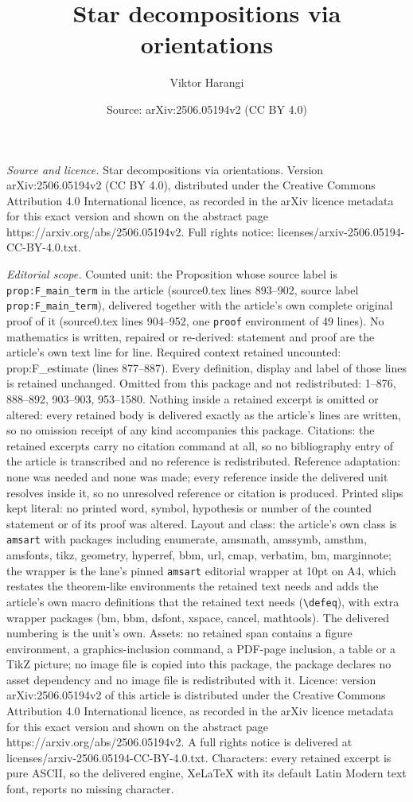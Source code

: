 \documentclass[10pt,a4paper]{amsart}
\title[Star decompositions via orientations]{Star decompositions via orientations}
\author{Viktor Harangi}
\date{Source: arXiv:2506.05194v2 (CC BY 4.0)}
\begin{document}
\maketitle

\noindent\emph{Source and licence.} Star decompositions via orientations. Version arXiv:2506.05194v2 (CC BY 4.0), distributed under the Creative Commons Attribution 4.0 International licence, as recorded in the arXiv licence metadata for this exact version and shown on the abstract page https://arxiv.org/abs/2506.05194v2. Full rights notice: licenses/arxiv-2506.05194-CC-BY-4.0.txt.\par\smallskip

\noindent\textit{Editorial scope.} Counted unit: the Proposition whose source label is \texttt{prop:F\_main\_term} in the article (source0.tex lines 893--902, source label \texttt{prop:F\_main\_term}), delivered together with the article's own complete original proof of it (source0.tex lines 904--952, one \texttt{proof} environment of 49 lines). No mathematics is written, repaired or re-derived: statement and proof are the article's own text line for line. Required context retained uncounted: prop:F\_estimate (lines 877--887). Every definition, display and label of those lines is retained unchanged. Omitted from this package and not redistributed: 1--876, 888--892, 903--903, 953--1580. Nothing inside a retained excerpt is omitted or altered: every retained body is delivered exactly as the article's lines are written, so no omission receipt of any kind accompanies this package. Citations: the retained excerpts carry no citation command at all, so no bibliography entry of the article is transcribed and no reference is redistributed. Reference adaptation: none was needed and none was made; every reference inside the delivered unit resolves inside it, so no unresolved reference or citation is produced. Printed slips kept literal: no printed word, symbol, hypothesis or number of the counted statement or of its proof was altered. Layout and class: the article's own class is \texttt{amsart} with packages including enumerate, amsmath, amssymb, amsthm, amsfonts, tikz, geometry, hyperref, bbm, url, cmap, verbatim, bm, marginnote; the wrapper is the lane's pinned \texttt{amsart} editorial wrapper at 10pt on A4, which restates the theorem-like environments the retained text needs and adds the article's own macro definitions that the retained text needs (\texttt{\textbackslash defeq}), with extra wrapper packages (bm, bbm, dsfont, xspace, cancel, mathtools). The delivered numbering is the unit's own. Assets: no retained span contains a figure environment, a graphics-inclusion command, a PDF-page inclusion, a table or a TikZ picture; no image file is copied into this package, the package declares no asset dependency and no image file is redistributed with it. Licence: version arXiv:2506.05194v2 of this article is distributed under the Creative Commons Attribution 4.0 International licence, as recorded in the arXiv licence metadata for this exact version and shown on the abstract page https://arxiv.org/abs/2506.05194v2. A full rights notice is delivered at licenses/arxiv-2506.05194-CC-BY-4.0.txt. Characters: every retained excerpt is pure ASCII, so the delivered engine, XeLaTeX with its default Latin Modern text font, reports no missing character.
\end{document}
